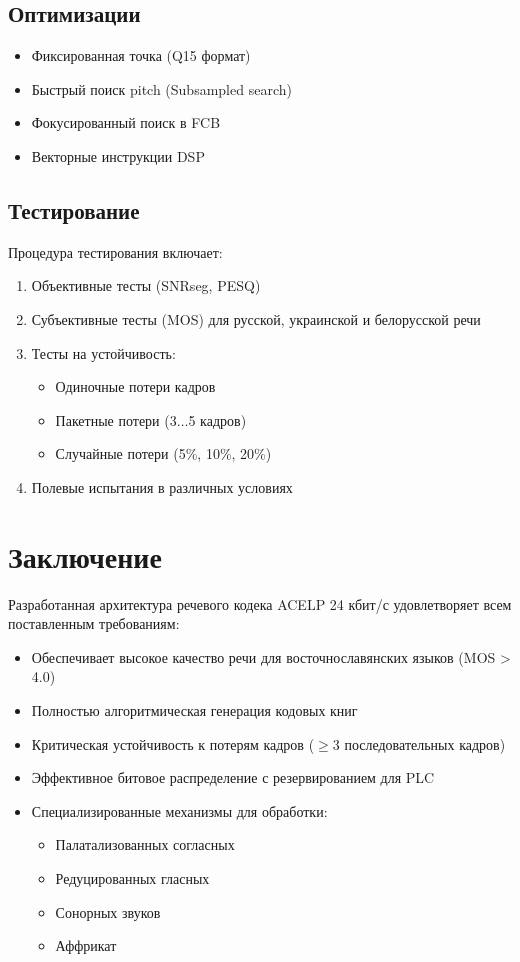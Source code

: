 \documentclass{report}
\begin{document}
	\section{Оптимизации}
	\begin{itemize}
		\item Фиксированная точка (Q15 формат)
		\item Быстрый поиск pitch (Subsampled search)
		\item Фокусированный поиск в FCB
		\item Векторные инструкции DSP
	\end{itemize}
	
	\section{Тестирование}
	Процедура тестирования включает:
	\begin{enumerate}
		\item Объективные тесты (SNRseg, PESQ)
		\item Субъективные тесты (MOS) для русской, украинской и белорусской речи
		\item Тесты на устойчивость:
		\begin{itemize}
			\item Одиночные потери кадров
			\item Пакетные потери (3$\ldots$5 кадров)
			\item Случайные потери (5\%, 10\%, 20\%)
		\end{itemize}
		\item Полевые испытания в различных условиях
	\end{enumerate}
	
	\chapter*{Заключение}
	Разработанная архитектура речевого кодека ACELP 24 кбит/с удовлетворяет всем поставленным требованиям:
	\begin{itemize}
		\item Обеспечивает высокое качество речи для восточнославянских языков (MOS > 4.0)
		\item Полностью алгоритмическая генерация кодовых книг
		\item Критическая устойчивость к потерям кадров ($\geqslant$3 последовательных кадров)
		\item Эффективное битовое распределение с резервированием для PLC
		\item Специализированные механизмы для обработки:
		\begin{itemize}
			\item Палатализованных согласных
			\item Редуцированных гласных
			\item Сонорных звуков
			\item Аффрикат
		\end{itemize}
	\end{itemize}
	
\end{document}
